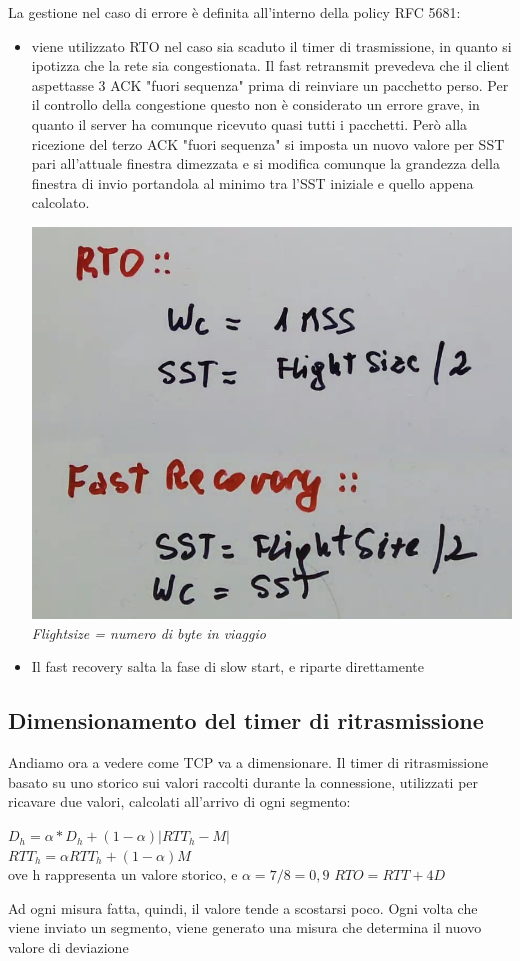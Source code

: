 \documentclass[11pt, oneside]{article}   	%
\begin{document}
La gestione nel caso di errore è definita all'interno della policy RFC 5681: 
\begin{itemize}
\item viene utilizzato RTO nel caso sia scaduto il timer di trasmissione, in quanto si ipotizza che la rete sia congestionata. Il fast retransmit prevedeva che il client aspettasse 3 ACK "fuori sequenza" prima di reinviare un pacchetto perso. Per il controllo della congestione questo non è considerato un errore grave, in quanto il server ha comunque ricevuto quasi tutti i pacchetti. Però alla ricezione del terzo ACK "fuori sequenza" si imposta un nuovo valore per SST pari all'attuale finestra dimezzata e si modifica comunque la grandezza della finestra di invio portandola al minimo tra l'SST iniziale e quello appena calcolato.
\begin{center}
\includegraphics[scale=0.5]{t10}\\
\emph{Flightsize = numero di byte in viaggio}
\end{center}
\item Il fast recovery salta la fase di slow start, e riparte direttamente
\end{itemize}

\subsection*{Dimensionamento del timer di ritrasmissione}
Andiamo ora a vedere come TCP va a dimensionare. Il timer di ritrasmissione basato su uno storico sui valori raccolti durante la connessione, utilizzati per ricavare due valori, calcolati all'arrivo di ogni segmento: \begin{center}
$D_h = \alpha * D_h + (1 - \alpha) |RTT_h -M|$\\
$RTT_h = \alpha RTT_h + (1-\alpha)M$\\
ove h rappresenta un valore storico, e $\alpha = 7/8 = 0,9$
$RTO = RTT + 4D$
\end{center}
Ad ogni misura fatta, quindi, il valore tende a scostarsi poco. Ogni volta che viene inviato un segmento, viene generato una misura che determina il nuovo valore di deviazione
\end{document}
